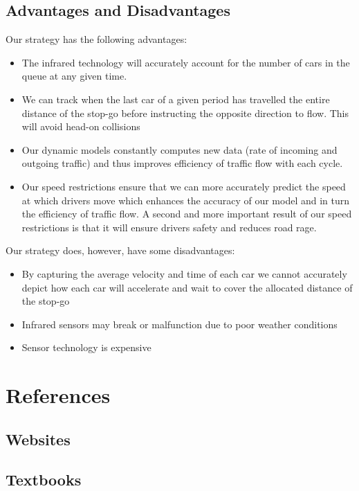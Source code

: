 \documentclass[a4paper]{article}
\begin{document}
\subsection{Advantages and Disadvantages}
Our strategy has the following advantages:
\begin{itemize}
\item The infrared technology will accurately account for the number of cars in the queue at any given time.
\item We can track when the last car of a given period has travelled the entire distance of the stop-go before instructing the opposite direction to flow. This will avoid head-on collisions
\item Our dynamic models constantly computes new data (rate of incoming and outgoing traffic) and thus improves efficiency of traffic flow with each cycle.
\item Our speed restrictions ensure that we can more accurately predict the speed at which drivers move which enhances the accuracy of our model and in turn the efficiency of traffic flow. A second and more important result of our speed restrictions is that it will ensure drivers safety and reduces road rage.
\end{itemize}
Our strategy does, however, have some disadvantages:
\begin{itemize}
\item By capturing the average velocity and time of each car we cannot accurately depict how each car will accelerate and wait to cover the allocated distance of the stop-go
\item Infrared sensors may break or malfunction due to poor weather conditions
\item Sensor technology is expensive
\end{itemize}

\section{References}

\subsection{Websites}


\subsection{Textbooks}
\end{document}

